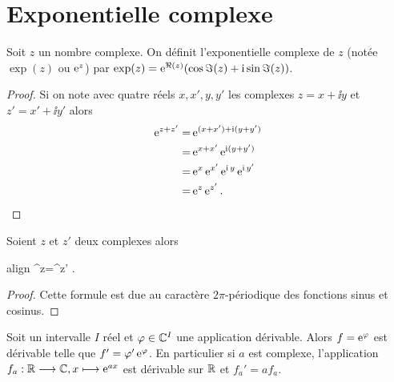 \section{Exponentielle complexe}
\label{sec:expcomplexe}
\begin{defdef}
    Soit \(z\) un nombre complexe. On définit l'exponentielle complexe de \(z\) 
    (notée \(\exp(z)\) ou \(\operatorname{e}^z\)) par \(\exp(z)=\operatorname{e}^{\Re(z)}(\cos \Im(z) + \operatorname{i} 
    \sin \Im(z))\).
\end{defdef}
\begin{proof}
    Si on note avec quatre réels \(x,x',y,y'\) les complexes \(z=x+\ii y\) et 
    \(z'=x'+\ii y'\) alors
    \begin{align}
        \operatorname{e}^{z+z'} =& \operatorname{e}^{(x+x') + \operatorname{i}(y+y')}\\
        =&\operatorname{e}^{x+x'} \operatorname{e}^{\operatorname{i} (y+y')}\\
        =& \operatorname{e}^{x} \operatorname{e}^{x'} \operatorname{e}^{\operatorname{i} y} \operatorname{e}^{\operatorname{i} y'}\\
        =& \operatorname{e}^z \operatorname{e}^{z'}.
    \end{align}
\end{proof}
\begin{prop}
    Soient \(z\) et \(z'\) deux complexes alors
    \begin{empheq}[box=\shadowbox*]{align}
        \e^z=\e^{z'} \iff {}.
    \end{empheq}
\end{prop}
\begin{proof}
    Cette formule est due au caractère \(2\pi\)-périodique des fonctions sinus 
    et cosinus.
\end{proof}
\begin{prop}
    Soit un intervalle \(I\) réel et \(\varphi \in \mathbb{C}^{I}\) une application 
    dérivable. Alors \(f=\operatorname{e}^\varphi\) est dérivable telle que \(f'=\varphi' 
    \operatorname{e}^\varphi\). En particulier si \(a\) est complexe, l'application 
    \(f_a:\mathbb{R} \longrightarrow \mathbb{C}, x \longmapsto \operatorname{e}^{ax}\) est dérivable sur \(\mathbb{R}\) et 
    \(f_a'=af_a\).
\end{prop}
